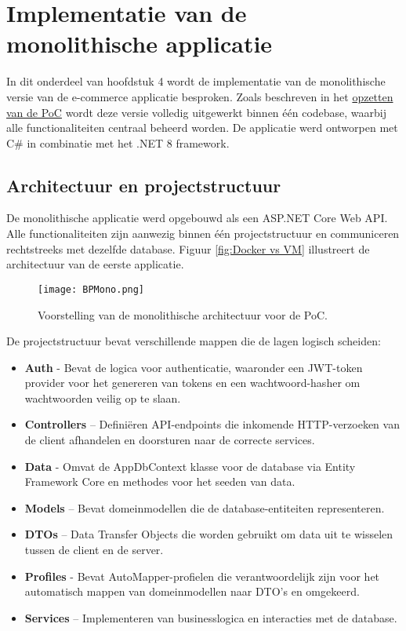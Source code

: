 \section{Implementatie van de monolithische applicatie}

In dit onderdeel van hoofdstuk 4 wordt de implementatie van de monolithische versie van de e-commerce applicatie besproken. Zoals beschreven in het \hyperref[opzetten_poc]{opzetten van de PoC} wordt deze versie volledig uitgewerkt binnen één codebase, waarbij alle functionaliteiten centraal beheerd worden. De applicatie werd ontworpen met C\# in combinatie met het .NET 8 framework.

\subsection{Architectuur en projectstructuur}

De monolithische applicatie werd opgebouwd als een ASP.NET Core Web API. Alle functionaliteiten zijn aanwezig binnen één projectstructuur en communiceren rechtstreeks met dezelfde database. Figuur \ref{fig:Docker vs VM} illustreert de architectuur van de eerste applicatie.

\begin{figure}[H]
	\centering
	\texttt{[image: BPMono.png]}
	\caption[Voorstelling van de monolithische architectuur voor de PoC.]{\label{fig:BPMono}Voorstelling van de monolithische architectuur voor de PoC.\linebreak}
\end{figure}

De projectstructuur bevat verschillende mappen die de lagen logisch scheiden:

\begin{itemize}
	\item \textbf{Auth} - Bevat de logica voor authenticatie, waaronder een JWT-token provider voor het genereren van tokens en een wachtwoord-hasher om wachtwoorden veilig op te slaan.
	\item \textbf{Controllers} – Definiëren API-endpoints die inkomende HTTP-verzoeken van de client afhandelen en doorsturen naar de correcte services.
	\item \textbf{Data} - Omvat de AppDbContext klasse voor de database via Entity Framework Core en methodes voor het seeden van data.
	\item \textbf{Models} – Bevat domeinmodellen die de database-entiteiten representeren.
	\item \textbf{DTOs} – Data Transfer Objects die worden gebruikt om data uit te wisselen tussen de client en de server. 
	\item \textbf{Profiles} - Bevat AutoMapper-profielen die verantwoordelijk zijn voor het automatisch mappen van domeinmodellen naar DTO's en omgekeerd.
	\item \textbf{Services} – Implementeren van businesslogica en interacties met de database.
\end{itemize}

